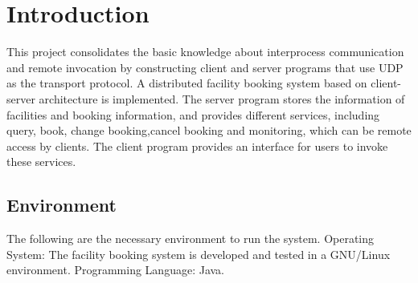 
\chapter{Introduction}
\begin{spacing}{1}
\setlength{\parskip}{0in}

This project consolidates the basic knowledge about interprocess communication and remote invocation by constructing client and server programs that use UDP as the transport protocol. A distributed facility booking system based on client-server architecture is implemented. The server program stores the information of facilities and booking information, and provides different services,  including query, book, change booking,cancel booking and monitoring, which can be remote access by clients. The client program provides an interface for users to invoke these services.

\section{Environment}

The following are the necessary environment to run the system.
Operating System: The facility booking system is developed and tested in a GNU/Linux environment.
Programming Language: Java.



\end{spacing}
